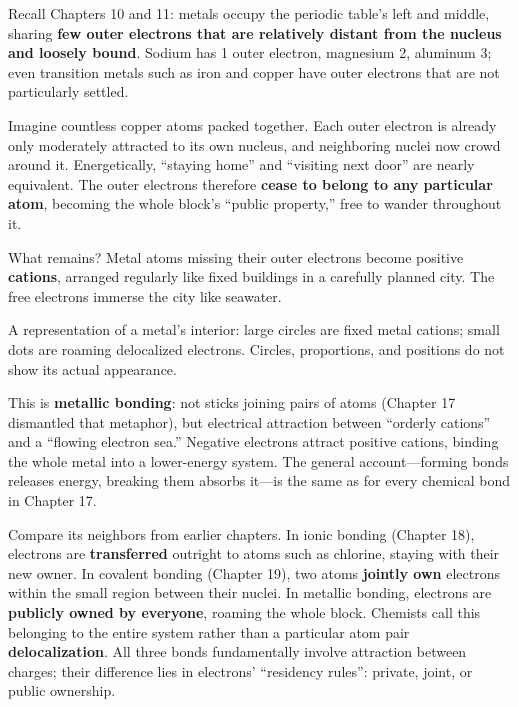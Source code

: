 Recall Chapters 10 and 11: metals occupy the periodic table's left and middle, sharing \textbf{few outer electrons that are relatively distant from the nucleus and loosely bound}. Sodium has 1 outer electron, magnesium 2, aluminum 3; even transition metals such as iron and copper have outer electrons that are not particularly settled.

Imagine countless copper atoms packed together. Each outer electron is already only moderately attracted to its own nucleus, and neighboring nuclei now crowd around it. Energetically, ``staying home'' and ``visiting next door'' are nearly equivalent. The outer electrons therefore \textbf{cease to belong to any particular atom}, becoming the whole block's ``public property,'' free to wander throughout it.

What remains? Metal atoms missing their outer electrons become positive \textbf{cations}, arranged regularly like fixed buildings in a carefully planned city. The free electrons immerse the city like seawater.

\begin{center}

\footnotesize A representation of a metal's interior: large circles are fixed metal cations; small dots are roaming delocalized electrons. Circles, proportions, and positions do not show its actual appearance.
\end{center}

This is \textbf{metallic bonding}: not sticks joining pairs of atoms (Chapter 17 dismantled that metaphor), but electrical attraction between ``orderly cations'' and a ``flowing electron sea.'' Negative electrons attract positive cations, binding the whole metal into a lower-energy system. The general account---forming bonds releases energy, breaking them absorbs it---is the same as for every chemical bond in Chapter 17.

Compare its neighbors from earlier chapters. In ionic bonding (Chapter 18), electrons are \textbf{transferred} outright to atoms such as chlorine, staying with their new owner. In covalent bonding (Chapter 19), two atoms \textbf{jointly own} electrons within the small region between their nuclei. In metallic bonding, electrons are \textbf{publicly owned by everyone}, roaming the whole block. Chemists call this belonging to the entire system rather than a particular atom pair \textbf{delocalization}. All three bonds fundamentally involve attraction between charges; their difference lies in electrons' ``residency rules'': private, joint, or public ownership.

